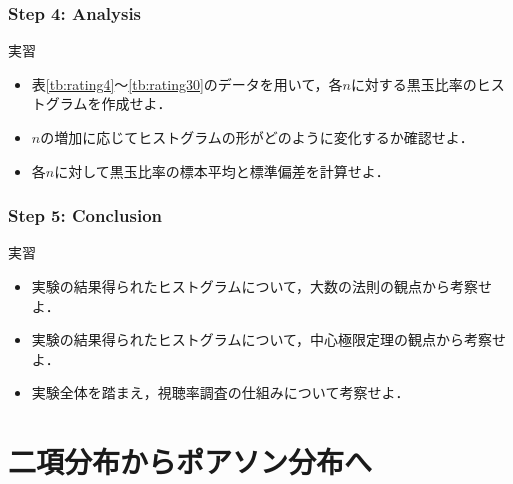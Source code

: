 \subsubsection*{Step 4: Analysis}
%
%
\begin{itembox}[l]{実習}
%
\begin{itemize}
\item
表\ref{tb:rating4}〜\ref{tb:rating30}のデータを用いて，各$ n $に対する黒玉比率のヒストグラムを作成せよ．
\item
$ n $の増加に応じてヒストグラムの形がどのように変化するか確認せよ．
\item
各$ n $に対して黒玉比率の標本平均と標準偏差を計算せよ．
\end{itemize}
%
\end{itembox}
%

\subsubsection*{Step 5: Conclusion}
\begin{itembox}[l]{実習}
%
\begin{itemize}
\item
実験の結果得られたヒストグラムについて，大数の法則の観点から考察せよ．

\item
実験の結果得られたヒストグラムについて，中心極限定理の観点から考察せよ．

\item
実験全体を踏まえ，視聴率調査の仕組みについて考察せよ．
\end{itemize}
%
\end{itembox}

%

\clearpage
\section{二項分布からポアソン分布へ}

